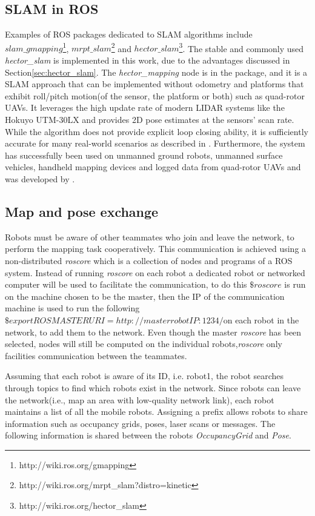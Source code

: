 \subsection{SLAM in ROS}

Examples of ROS packages dedicated to SLAM algorithms include \(slam\_gmapping\)\footnote{http://wiki.ros.org/gmapping}, \(mrpt\_slam\)\footnote{http://wiki.ros.org/mrpt\_slam?distro=kinetic} and \(hector\_slam\)\footnote{http://wiki.ros.org/hector\_slam}. The stable and commonly used \textit{hector\_slam} is implemented in this work, due to the advantages discussed in Section\ref{sec:hector_slam}. The \textit{hector\_mapping} node is in the package, and it is a SLAM approach that can be implemented without odometry and platforms that exhibit roll/pitch motion(of the sensor, the platform or both) such as quad-rotor UAVs. It leverages the high update rate of modern LIDAR systems like the Hokuyo UTM-30LX and provides 2D pose estimates at the sensors' scan rate. While the algorithm does not provide explicit loop closing ability, it is sufficiently accurate for many real-world scenarios as described in \cite{Eliwa2017}. Furthermore, the system has successfully been used on unmanned ground robots, unmanned surface vehicles, handheld mapping devices and logged data from quad-rotor UAVs and was developed by \cite{Kohlbrecher2011a}.

\subsection{Map and pose exchange}

Robots must be aware of other teammates who join and leave the network, to perform the mapping task cooperatively.  This communication is achieved using a non-distributed \textit{roscore} which is a collection of nodes and programs of a ROS system.  Instead of running \textit{roscore} on each robot a dedicated robot or networked computer will be used to facilitate the communication, to do this \(\$roscore\) is run on the machine chosen to be the master, then the IP of the communication machine is used to run the following \(\$export ROSMASTERURI=http://masterrobotIP:1234/ \)on each robot in the network, to add them to the network.  Even though the master \textit{roscore} has been selected, nodes will still be computed on the individual robots,\textit{roscore} only facilities communication between the teammates.

Assuming that each robot is aware of its ID, i.e. robot1, the robot searches through topics to find which robots exist in the network.   Since robots can leave the network(i.e., map an area with low-quality network link), each robot maintains a list of all the mobile robots.   Assigning a  prefix allows robots to share information such as occupancy grids,  poses, laser scans or messages.  The following information is shared between the robots \textit{OccupancyGrid} and \textit{Pose}.

